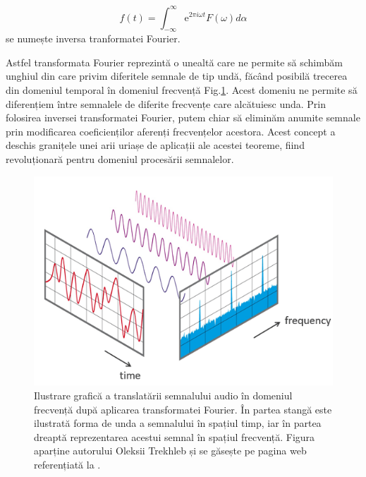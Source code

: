 \documentclass[a4paper,12pt]{book}
\begin{document}
			\begin{equation*}
				f(t) = \int_{-\infty}^{\infty}  \mathrm{e}^{2\pi i\omega t} F(\omega) d\alpha
			\end{equation*}
			se numește inversa tranformatei Fourier. \par
			Astfel transformata Fourier reprezintă o unealtă care ne permite să schimbăm unghiul din care privim diferitele semnale de tip undă, făcând posibilă trecerea din domeniul temporal în domeniul frecvență Fig.\ref{fig:tf}. Acest domeniu ne permite să diferențiem între semnalele de diferite frecvențe care alcătuiesc unda. Prin folosirea inversei transformatei Fourier, putem chiar să eliminăm anumite semnale prin modificarea coeficienților aferenți frecvențelor acestora. Acest concept a deschis granițele unei arii uriașe de aplicații ale acestei teoreme, fiind revoluționară pentru domeniul procesării semnalelor.  	
				\begin{figure}[h]
					\centering
					\includegraphics[scale=0.50]{ft}
					\caption{Ilustrare grafică a translatării semnalului audio în domeniul frecvență după aplicarea transformatei Fourier.  În partea stangă este ilustrată forma de unda a semnalului în spațiul timp, iar în partea dreaptă reprezentarea acestui semnal în spațiul frecvență. Figura aparține autorului Oleksii Trekhleb și se găsește pe pagina web referențiată la \cite{stft6}.}
					\label{fig:tf}
				\end{figure}		
				
\end{document}
